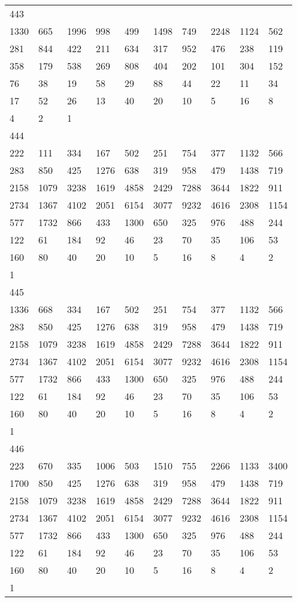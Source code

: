 \begin{longtable}{*{10}{l}}
443&&&&&&&&&\\
1330& 665& 1996& 998& 499& 1498& 749& 2248& 1124& 562\\
281& 844& 422& 211& 634& 317& 952& 476& 238& 119\\
358& 179& 538& 269& 808& 404& 202& 101& 304& 152\\
76& 38& 19& 58& 29& 88& 44& 22& 11& 34\\
17& 52& 26& 13& 40& 20& 10& 5& 16& 8\\
4& 2& 1& \\

444&&&&&&&&&\\
222& 111& 334& 167& 502& 251& 754& 377& 1132& 566\\
283& 850& 425& 1276& 638& 319& 958& 479& 1438& 719\\
2158& 1079& 3238& 1619& 4858& 2429& 7288& 3644& 1822& 911\\
2734& 1367& 4102& 2051& 6154& 3077& 9232& 4616& 2308& 1154\\
577& 1732& 866& 433& 1300& 650& 325& 976& 488& 244\\
122& 61& 184& 92& 46& 23& 70& 35& 106& 53\\
160& 80& 40& 20& 10& 5& 16& 8& 4& 2\\
1& \\

445&&&&&&&&&\\
1336& 668& 334& 167& 502& 251& 754& 377& 1132& 566\\
283& 850& 425& 1276& 638& 319& 958& 479& 1438& 719\\
2158& 1079& 3238& 1619& 4858& 2429& 7288& 3644& 1822& 911\\
2734& 1367& 4102& 2051& 6154& 3077& 9232& 4616& 2308& 1154\\
577& 1732& 866& 433& 1300& 650& 325& 976& 488& 244\\
122& 61& 184& 92& 46& 23& 70& 35& 106& 53\\
160& 80& 40& 20& 10& 5& 16& 8& 4& 2\\
1& \\

446&&&&&&&&&\\
223& 670& 335& 1006& 503& 1510& 755& 2266& 1133& 3400\\
1700& 850& 425& 1276& 638& 319& 958& 479& 1438& 719\\
2158& 1079& 3238& 1619& 4858& 2429& 7288& 3644& 1822& 911\\
2734& 1367& 4102& 2051& 6154& 3077& 9232& 4616& 2308& 1154\\
577& 1732& 866& 433& 1300& 650& 325& 976& 488& 244\\
122& 61& 184& 92& 46& 23& 70& 35& 106& 53\\
160& 80& 40& 20& 10& 5& 16& 8& 4& 2\\
1& \\


\end{longtable}
